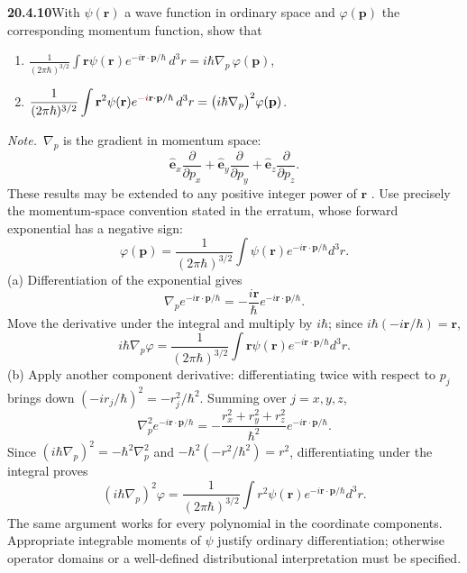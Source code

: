 \par\bigskip
\noindent\textbf{20.4.10}\quad With $\psi(\mathbf{r})$ a wave
function in ordinary space and $\varphi(\mathbf{p})$ the
corresponding momentum function, show that
\begin{enumerate}
\item[(a)] $\displaystyle\frac{1}{(2\pi\hbar)^{3/2}}
\int\mathbf{r}\psi(\mathbf{r})
e^{-i\mathbf{r}\cdot\mathbf{p}/\hbar}\,d^{3}r
=i\hbar\nabla_{p}\,\varphi(\mathbf{p})$,
\item[(b)] $\displaystyle\frac{1}{(2\pi\hbar)^{3/2}}
\int\mathbf{r}^{2}\psi(\mathbf{r})
e^{\erratum{-i}\mathbf{r}\cdot\mathbf{p}/\hbar}\,d^{3}r
=\big(i\hbar\nabla_{p}\big)^{2}\varphi(\mathbf{p})$.
\end{enumerate}
\par{}
\par\emph{Note.}~$\nabla_{p}$ is the gradient in momentum space:
\[
\hat{\mathbf{e}}_{x}\frac{\partial}{\partial p_{x}}
+\hat{\mathbf{e}}_{y}\frac{\partial}{\partial p_{y}}
+\hat{\mathbf{e}}_{z}\frac{\partial}{\partial p_{z}}.
\]
These results may be extended to any positive integer power of
$\mathbf{r}$ .
\solution
Use precisely the momentum-space convention stated
in the erratum, whose forward exponential has a negative sign:
\[
\varphi(\mathbf p)=\frac1{(2\pi\hbar)^{3/2}}\int
\psi(\mathbf r)e^{-i\mathbf r\cdot\mathbf p/\hbar}d^3r.
\]
(a) Differentiation of the exponential gives
\[
\nabla_p e^{-i\mathbf r\cdot\mathbf p/\hbar}
=-\frac{i\mathbf r}{\hbar}e^{-i\mathbf r\cdot\mathbf p/\hbar}.
\]
Move the derivative under the integral and multiply by $i\hbar$;
since $i\hbar(-i\mathbf r/\hbar)=\mathbf r$,
\[
\boxed{i\hbar\nabla_p\varphi
=\frac1{(2\pi\hbar)^{3/2}}\int
\mathbf r\psi(\mathbf r)e^{-i\mathbf r\cdot\mathbf p/\hbar}d^3r}.
\]
(b) Apply another component derivative: differentiating twice
with respect to $p_j$ brings down
$(-ir_j/\hbar)^2=-r_j^2/\hbar^2$. Summing over $j=x,y,z$,
\[
\nabla_p^2 e^{-i\mathbf r\cdot\mathbf p/\hbar}
=-\frac{r_x^2+r_y^2+r_z^2}{\hbar^2}e^{-i\mathbf r\cdot\mathbf p/\hbar}.
\]
Since $(i\hbar\nabla_p)^2=-\hbar^2\nabla_p^2$ and
$-\hbar^2(-r^2/\hbar^2)=r^2$, differentiating under the integral
proves
\[
\boxed{(i\hbar\nabla_p)^2\varphi
=\frac1{(2\pi\hbar)^{3/2}}\int r^2\psi(\mathbf r)
e^{-i\mathbf r\cdot\mathbf p/\hbar}d^3r}.
\]
The same argument works for every polynomial in the coordinate
components. Appropriate integrable moments of $\psi$ justify
ordinary differentiation; otherwise operator domains or a
well-defined distributional interpretation must be specified.

